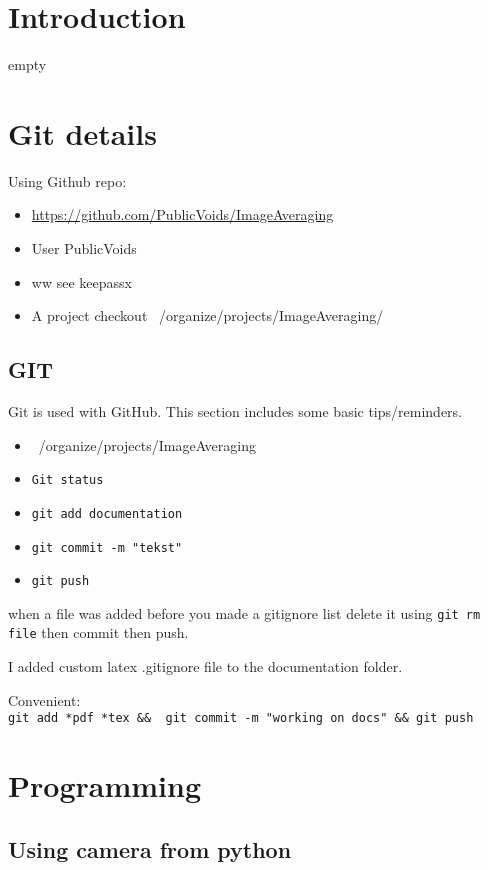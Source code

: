 \documentclass[10pt,a4paper]{report}
\author{Jeroen Keizer}
\begin{document}
\chapter{Introduction}
empty
\chapter{Git details}
Using Github repo:
\begin{itemize}
\item \url{https://github.com/PublicVoids/ImageAveraging}
\item User PublicVoids
\item ww see keepassx
\item A project checkout  ~/organize/projects/ImageAveraging/
\end{itemize}
\section{GIT}
Git is used with GitHub.
This section includes some basic tips/reminders.
\begin{itemize}
\item ~/organize/projects/ImageAveraging
\item \verb|Git status|
\item \verb|git add documentation|
\item \verb|git commit -m "tekst"|
\item \verb|git push|
\end{itemize}
when a file was added before you made a gitignore list delete it using \verb|git rm file| then commit then push.

I added custom latex .gitignore file to the documentation folder.

Convenient:\\
\verb|git add *pdf *tex &&  git commit -m "working on docs" && git push|


\chapter{Programming}
\section{Using camera from python}
\end{document}

